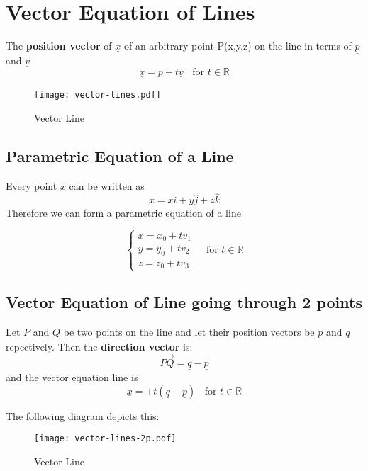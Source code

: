 \section{Vector Equation of Lines}

\begin{definition}
	The {\bf position vector} of $\underline{x}$ of an arbitrary point P(x,y,z) on the line in terms of $\underline{p}$ and $\underline{v}$
	\begin{equation}
		\label{eq: vector-lines}
		\underline{x} = \underline{p} + t\underline{v} \ \ \ \ \text{for } t \in \mathbb{R}
	\end{equation}
\end{definition}

\begin{figure}[H]
	\centering
	\texttt{[image: vector-lines.pdf]}
	\caption{Vector Line}
	\label{fig:figure-vector-lines}
\end{figure}

\subsection{Parametric Equation of a Line}
\begin{note}
	Every point $\underline{x}$ can be written as
	$$\underline{x} = x\hat{i} + y\hat{j} + z\hat{k}$$
	Therefore we can form a parametric equation of a line
\end{note}

\begin{definition}
	\begin{equation}
		\label{eq: parametric-vector-lines}
		\begin{cases}
			x = x_0 + tv_1 \\
			y= y_0 + tv_2  \\
			z = z_0 + tv_3
		\end{cases}
		\ \ \ \ \ \text{for } t \in \mathbb{R}
	\end{equation}

\end{definition}

\subsection{Vector Equation of Line going through 2 points}
\begin{definition}
	Let $P$ and $Q$ be two points on the line and let their position vectors be $\underline{p}$ and $\underline{q}$ repectively. Then the
		{\bf direction vector} is:
	$$\vec{PQ} = \underline{q} - \underline{p}$$
	and the vector equation line is
	\begin{equation}
		\label{eq vector-lines-2p}
		\underline{x} = + t(\underline{q} - \underline{p}) \ \ \ \ \text{for } t \in \mathbb{R}
	\end{equation}
\end{definition}
The following diagram depicts this:

\begin{figure}[H]
	\centering
	\texttt{[image: vector-lines-2p.pdf]}
	\caption{Vector Line}
	\label{fig:figure-vector-lines-2p}
\end{figure}
